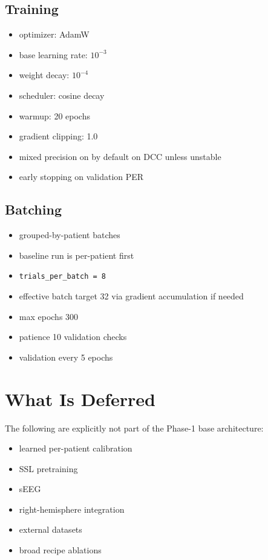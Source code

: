 \documentclass[11pt,letterpaper]{article}
\begin{document}
\subsection{Training}

\begin{itemize}[leftmargin=2em, itemsep=0.2em]
\item optimizer: AdamW
\item base learning rate: \(10^{-3}\)
\item weight decay: \(10^{-4}\)
\item scheduler: cosine decay
\item warmup: 20 epochs
\item gradient clipping: 1.0
\item mixed precision on by default on DCC unless unstable
\item early stopping on validation PER
\end{itemize}

\subsection{Batching}

\begin{itemize}[leftmargin=2em, itemsep=0.2em]
\item grouped-by-patient batches
\item baseline run is per-patient first
\item \texttt{trials\_per\_batch = 8}
\item effective batch target 32 via gradient accumulation if needed
\item max epochs 300
\item patience 10 validation checks
\item validation every 5 epochs
\end{itemize}


\section{What Is Deferred}

The following are explicitly not part of the Phase-1 base architecture:
\begin{itemize}[leftmargin=2em, itemsep=0.2em]
\item learned per-patient calibration
\item SSL pretraining
\item sEEG
\item right-hemisphere integration
\item external datasets
\item broad recipe ablations
\end{itemize}
\end{document}
